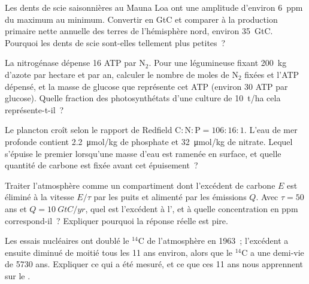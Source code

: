 \begin{exercise}[$\star\star$]\label{exo:b2:biogeochemical-cycles:7}
Les dents de scie saisonnières au Mauna Loa ont une amplitude d'environ
\qty{6}{ppm} du maximum au minimum. Convertir en GtC et comparer à la
production primaire nette annuelle des terres de l'hémisphère nord,
environ \qty{35}{GtC}. Pourquoi les dents de scie sont-elles tellement
plus petites~?
\end{exercise}

\begin{exercise}[$\star\star$]\label{exo:b2:biogeochemical-cycles:8}
La nitrogénase dépense 16 ATP par $\mathrm{N_2}$. Pour une légumineuse
fixant \qty{200}{kg} d'azote par hectare et par an, calculer le nombre de
moles de $\mathrm{N_2}$ fixées et l'ATP dépensé, et la masse de glucose que
représente cet ATP (environ 30 ATP par glucose). Quelle fraction des
photosynthétats d'une culture de \qty{10}{t/ha} cela représente-t-il~?
\end{exercise}

\begin{exercise}[$\star\star$]\label{exo:b2:biogeochemical-cycles:9}
Le plancton croît selon le rapport de Redfield $\mathrm{C:N:P} = 106:16:1$.
L'eau de mer profonde contient \qty{2.2}{\micro mol/kg} de phosphate et
\qty{32}{\micro mol/kg} de nitrate. Lequel s'épuise le premier lorsqu'une
masse d'eau est ramenée en surface, et quelle quantité de carbone est
fixée avant cet épuisement~?
\end{exercise}

\begin{exercise}[$\star\star\star$]\label{exo:b2:biogeochemical-cycles:10}
Traiter l'atmosphère comme un compartiment dont l'excédent de carbone $E$
est éliminé à la vitesse $E/\tau$ par les puits et alimenté par les
émissions $Q$. Avec $\tau =
50$ ans et $Q = \qty{10}{GtC/yr}$, quel est l'excédent à l', et à quelle concentration en ppm correspond-il~? Expliquer
pourquoi la réponse réelle est pire.
\end{exercise}

\begin{exercise}[$\star\star\star$]\label{exo:b2:biogeochemical-cycles:11}
Les essais nucléaires ont doublé le $\mathrm{{}^{14}C}$ de l'atmosphère en
1963~; l'excédent a ensuite diminué de moitié tous les 11 ans environ,
alors que le $\mathrm{{}^{14}C}$
a une demi-vie de 5730 ans. Expliquer ce qui a été mesuré, et ce que ces
11 ans nous apprennent sur le .
\end{exercise}

